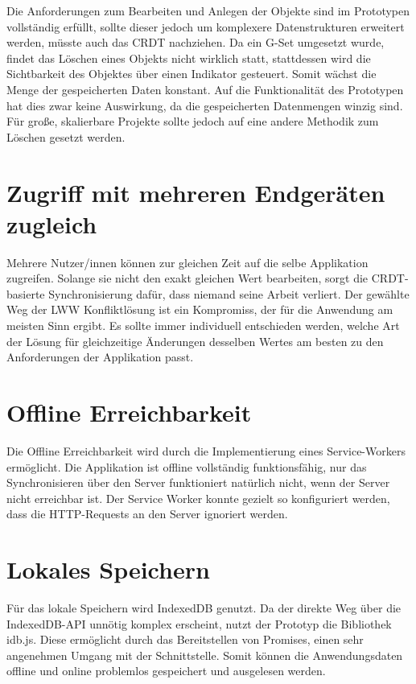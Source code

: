 \documentclass[a4paper, 12pt]{scrreprt}
\begin{document}
Die Anforderungen zum Bearbeiten und Anlegen der Objekte sind im Prototypen vollständig erfüllt, sollte dieser jedoch um komplexere Datenstrukturen erweitert werden, müsste auch das CRDT nachziehen. Da ein \ac{G-Set} umgesetzt wurde, findet das Löschen eines Objekts nicht wirklich statt, stattdessen wird die Sichtbarkeit des Objektes über einen Indikator gesteuert. Somit wächst die Menge der gespeicherten Daten konstant. Auf die Funktionalität des Prototypen hat dies zwar keine Auswirkung, da die gespeicherten Datenmengen winzig sind. Für große, skalierbare Projekte sollte jedoch auf eine andere Methodik zum Löschen gesetzt werden.

\section{Zugriff mit mehreren Endgeräten zugleich}
Mehrere Nutzer/innen können zur gleichen Zeit auf die selbe Applikation zugreifen. Solange sie nicht den exakt gleichen Wert bearbeiten, sorgt die CRDT-basierte Synchronisierung dafür, dass niemand seine Arbeit verliert. Der gewählte Weg der \ac{LWW} Konfliktlösung ist ein Kompromiss, der für die Anwendung am meisten Sinn ergibt. Es sollte immer individuell entschieden werden, welche Art der Lösung für gleichzeitige Änderungen desselben Wertes am besten zu den Anforderungen der Applikation passt.

\section{Offline Erreichbarkeit}
Die Offline Erreichbarkeit wird durch die Implementierung eines Service-Workers ermöglicht. Die Applikation ist offline vollständig funktionsfähig, nur das Synchronisieren über den Server funktioniert natürlich nicht, wenn der Server nicht erreichbar ist. Der Service Worker konnte gezielt so konfiguriert werden, dass die \ac{HTTP}-Requests an den Server ignoriert werden.

\section{Lokales Speichern}
Für das lokale Speichern wird IndexedDB genutzt. Da der direkte Weg über die IndexedDB-API unnötig komplex erscheint, nutzt der Prototyp die Bibliothek idb.js. Diese ermöglicht durch das Bereitstellen von Promises, einen sehr angenehmen Umgang mit der Schnittstelle. Somit können die Anwendungsdaten offline und online problemlos gespeichert und ausgelesen werden.
\end{document}
